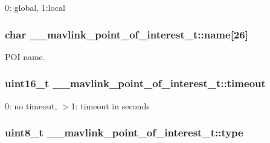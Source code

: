 0\+: global, 1\+:local 

\hypertarget{struct____mavlink__point__of__interest__t_a85b969f50fb77d09f243951890707275}{
\subsubsection[{name}]{\setlength{\rightskip}{0pt plus 5cm}char \+\_\+\+\_\+mavlink\+\_\+point\+\_\+of\+\_\+interest\+\_\+t\+::name\mbox{[}26\mbox{]}}}\label{struct____mavlink__point__of__interest__t_a85b969f50fb77d09f243951890707275}


P\+O\+I name. 

\hypertarget{struct____mavlink__point__of__interest__t_a8708d61ab4a7cbc7197b052c5e33e37a}{
\subsubsection[{timeout}]{\setlength{\rightskip}{0pt plus 5cm}uint16\+\_\+t \+\_\+\+\_\+mavlink\+\_\+point\+\_\+of\+\_\+interest\+\_\+t\+::timeout}}\label{struct____mavlink__point__of__interest__t_a8708d61ab4a7cbc7197b052c5e33e37a}


0\+: no timeout, $>$1\+: timeout in seconds 

\hypertarget{struct____mavlink__point__of__interest__t_aa9ac2d29aef58bfb1794539fdd98aa35}{
\subsubsection[{type}]{\setlength{\rightskip}{0pt plus 5cm}uint8\+\_\+t \+\_\+\+\_\+mavlink\+\_\+point\+\_\+of\+\_\+interest\+\_\+t\+::type}}\label{struct____mavlink__point__of__interest__t_aa9ac2d29aef58bfb1794539fdd98aa35}


